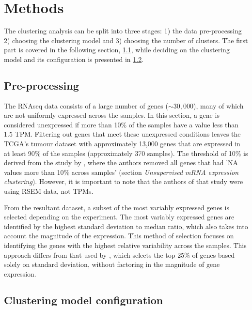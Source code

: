 \section{Methods} \label{s:cs:methods}



The clustering analysis can be split into three stages: 1) the data pre-processing 2) choosing the clustering model and 3) choosing the number of clusters. The first part is covered in the following section, \ref{s:cs:pre-processing}, while deciding on the clustering model and its configuration is presented in \cref{s:cs:right_config}.


\subsection{Pre-processing} \label{s:cs:pre-processing}

The RNAseq data consists of a large number of genes ($\sim30,000$), many of which are not uniformly expressed across the samples. In this section, a gene is considered unexpressed if more than 10\% of the samples have a value less than 1.5 TPM. Filtering out genes that meet these unexpressed conditions leaves the TCGA's tumour dataset with approximately 13,000 genes that are expressed in at least 90\% of the samples (approximately 370 samples). The threshold of 10\% is derived from the study by \citet{Robertson2017-mg}, where the authors removed all genes that had 'NA values more than 10\% across samples' (section \textit{Unsupervised mRNA expression clustering}). However, it is important to note that the authors of that study were using RSEM data, not TPMs.

From the resultant dataset, a subset of the most variably expressed genes is selected depending on the experiment. The most variably expressed genes are identified by the highest standard deviation to median ratio, which also takes into account the magnitude of the expression. This method of selection focuses on identifying the genes with the highest relative variability across the samples. This approach differs from that used by \citet{Robertson2017-mg}, which selects the top 25\% of genes based solely on standard deviation, without factoring in the magnitude of gene expression.


\subsection{Clustering model configuration} \label{s:cs:right_config}

